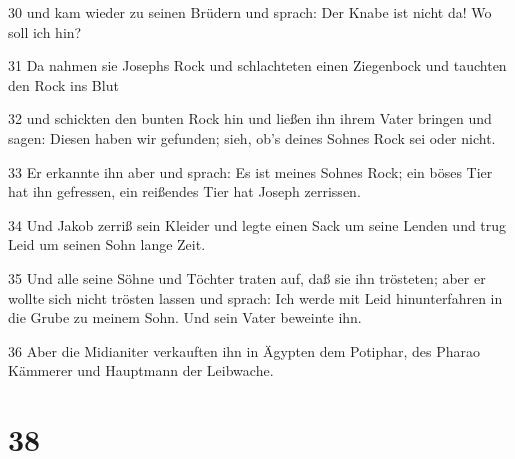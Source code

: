 \par 30 und kam wieder zu seinen Brüdern und sprach: Der Knabe ist nicht da! Wo soll ich hin?
\par 31 Da nahmen sie Josephs Rock und schlachteten einen Ziegenbock und tauchten den Rock ins Blut
\par 32 und schickten den bunten Rock hin und ließen ihn ihrem Vater bringen und sagen: Diesen haben wir gefunden; sieh, ob's deines Sohnes Rock sei oder nicht.
\par 33 Er erkannte ihn aber und sprach: Es ist meines Sohnes Rock; ein böses Tier hat ihn gefressen, ein reißendes Tier hat Joseph zerrissen.
\par 34 Und Jakob zerriß sein Kleider und legte einen Sack um seine Lenden und trug Leid um seinen Sohn lange Zeit.
\par 35 Und alle seine Söhne und Töchter traten auf, daß sie ihn trösteten; aber er wollte sich nicht trösten lassen und sprach: Ich werde mit Leid hinunterfahren in die Grube zu meinem Sohn. Und sein Vater beweinte ihn.
\par 36 Aber die Midianiter verkauften ihn in Ägypten dem Potiphar, des Pharao Kämmerer und Hauptmann der Leibwache.

\chapter{38}

